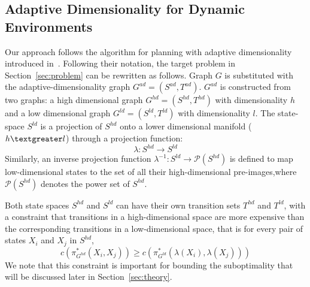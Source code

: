 \subsection{Adaptive Dimensionality for Dynamic Environments}
Our approach follows the algorithm for planning with adaptive dimensionality introduced in~\cite{gochev2011path}.
Following their notation, the target problem in Section~\ref{sec:problem} can be rewritten as follows.
Graph $G$ is substituted with the adaptive-dimensionality graph $G^{ad} = (S^{ad}, T^{ad})$. $G^{ad}$ is constructed from two graphs: a high dimensional graph $G^{hd} = (S^{hd}, T^{hd})$ with dimensionality $h$ and a low dimensional graph $G^{ld} = (S^{ld}, T^{ld})$ with dimensionality $l$. The state-space $S^{ld}$ is a projection of $S^{hd}$ onto a lower dimensional manifold ($ h \textgreater l$) through a projection function:
\begin{equation}
\lambda : S^{hd} \rightarrow S^{ld}
\end{equation}\label{eq:lambda}
Similarly, an inverse projection function $\lambda^{-1} : S^{ld} \rightarrow \mathcal{P}(S^{hd})$ is defined to map low-dimensional states to the set of all their high-dimensional pre-images,where $\mathcal{P}(S^{hd})$ denotes the power set of $S^{hd}$.

Both state spaces $S^{hd}$ and $S^{ld}$ can have their own transition sets $T^{hd}$ and $T^{ld}$,
with a constraint that transitions in a high-dimensional space are more expensive than the corresponding transitions in a low-dimensional space, that is for every pair of states $X_i$ and $X_j$ in $S^{hd}$,
\begin{equation}
c(\pi^*_{G^{hd}}(X_i,X_j)) \geq c(\pi^*_{G^{ld}}(\lambda(X_i), \lambda(X_j)))
\label{eq:cost}
\end{equation}
We note that this constraint is important for bounding the suboptimality that will be discussed later in Section~\ref{sec:theory}.




